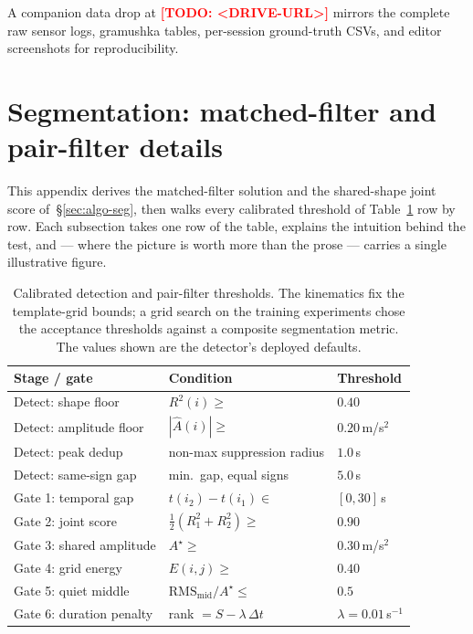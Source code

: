 \documentclass[manuscript,review,screen]{acmart}
\newcommand{\todo}[1]{\textcolor{red}{\textbf{[TODO: #1]}}}
\begin{document}
A companion data drop at \todo{<DRIVE-URL>} mirrors the complete
raw sensor logs, gramushka tables, per-session ground-truth CSVs,
and editor screenshots for reproducibility.

\clearpage
\section{Segmentation: matched-filter and pair-filter details}
\label{app:segmentation}
\label{app:thresholds}

This appendix derives the matched-filter solution and the
shared-shape joint score of~\S\ref{sec:algo-seg}, then walks every
calibrated threshold of Table~\ref{tab:seg-thresholds} row by row.
Each subsection takes one row of the table, explains the intuition
behind the test, and --- where the picture is worth more than the
prose --- carries a single illustrative figure.

\begin{table}[H]
\centering
\small
\begin{tabular}{lll}
\toprule
\textbf{Stage / gate} & \textbf{Condition} & \textbf{Threshold} \\
\midrule
Detect: shape floor      & $R^{2}(i)\ge$                  & $0.40$ \\
Detect: amplitude floor  & $|\hat A(i)|\ge$               & $0.20$\,m/s$^{2}$ \\
Detect: peak dedup       & non-max suppression radius     & $1.0$\,s \\
Detect: same-sign gap    & min.\ gap, equal signs         & $5.0$\,s \\
\midrule
Gate 1: temporal gap     & $t(i_2)-t(i_1)\in$             & $[0,30]$\,s \\
Gate 2: joint score      & $\tfrac12(R^{2}_1{+}R^{2}_2)\ge$ & $0.90$ \\
Gate 3: shared amplitude & $A^{\star}\ge$                 & $0.30$\,m/s$^{2}$ \\
Gate 4: grid energy      & $E(i,j)\ge$                    & $0.40$ \\
Gate 5: quiet middle     & $\mathrm{RMS}_{\mathrm{mid}}/A^{\star}\le$ & $0.5$ \\
Gate 6: duration penalty & rank $=S-\lambda\,\Delta t$ & $\lambda=0.01$\,s$^{-1}$ \\
\bottomrule
\end{tabular}
\caption{Calibrated detection and pair-filter thresholds.  The
  kinematics fix the template-grid bounds; a grid search on the
  training experiments chose the acceptance thresholds against a
  composite segmentation metric.  The values shown are the detector's
  deployed defaults.}
\label{tab:seg-thresholds}
\end{table}
\end{document}
